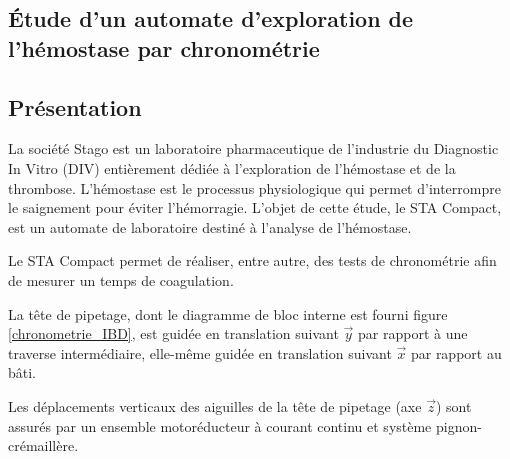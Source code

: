 \documentclass[10pt,fleqn]{article} %
\begin{document}

\vspace{5cm}
\pagestyle{fancy}
\thispagestyle{plain}

\def\columnseprulecolor{\color{ocre}}
\setlength{\columnseprule}{0.4pt} 

\def\pathfig{images}

\begin{multicols}{2}


\section*{Étude d'un automate d'exploration de l'hémostase par chronométrie}

\subsection*{Présentation}

La société Stago est un laboratoire pharmaceutique de l'industrie du Diagnostic In Vitro (DIV) entièrement dédiée à l'exploration de l'hémostase et de la thrombose. L'hémostase est le processus physiologique qui permet d'interrompre le saignement pour éviter l'hémorragie. L'objet de cette étude, le STA Compact, est un automate de laboratoire destiné à l'analyse de l'hémostase.

Le STA Compact permet de réaliser, entre autre, des tests de chronométrie afin de mesurer un
temps de coagulation. 


La tête de pipetage, dont le diagramme de bloc interne est fourni figure \ref{chronometrie_IBD}, est guidée en
translation suivant $\overrightarrow{y}$ par rapport à une traverse intermédiaire, elle-même guidée en translation
suivant $\overrightarrow{x}$ par rapport au bâti. 

Les déplacements verticaux des aiguilles de la tête de pipetage (axe $\overrightarrow{z}$) sont assurés par un ensemble
motoréducteur à courant continu et système pignon-crémaillère.





\end{multicols}
\end{document}
